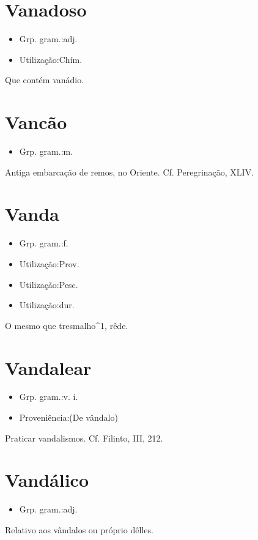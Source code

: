 \documentclass{article}
\begin{document}
\section{Vanadoso}
\begin{itemize}
\item {Grp. gram.:adj.}
\end{itemize}
\begin{itemize}
\item {Utilização:Chím.}
\end{itemize}
Que contém vanádio.
\section{Vancão}
\begin{itemize}
\item {Grp. gram.:m.}
\end{itemize}
Antiga embarcação de remos, no Oriente. Cf. \textunderscore Peregrinação\textunderscore , XLIV.
\section{Vanda}
\begin{itemize}
\item {Grp. gram.:f.}
\end{itemize}
\begin{itemize}
\item {Utilização:Prov.}
\end{itemize}
\begin{itemize}
\item {Utilização:Pesc.}
\end{itemize}
\begin{itemize}
\item {Utilização:dur.}
\end{itemize}
O mesmo que \textunderscore tresmalho\textunderscore ^1, rêde.
\section{Vandalear}
\begin{itemize}
\item {Grp. gram.:v. i.}
\end{itemize}
\begin{itemize}
\item {Proveniência:(De \textunderscore vândalo\textunderscore )}
\end{itemize}
Praticar vandalismos. Cf. Filinto, III, 212.
\section{Vandálico}
\begin{itemize}
\item {Grp. gram.:adj.}
\end{itemize}
Relativo aos vândalos ou próprio dêlles.
\end{document}
